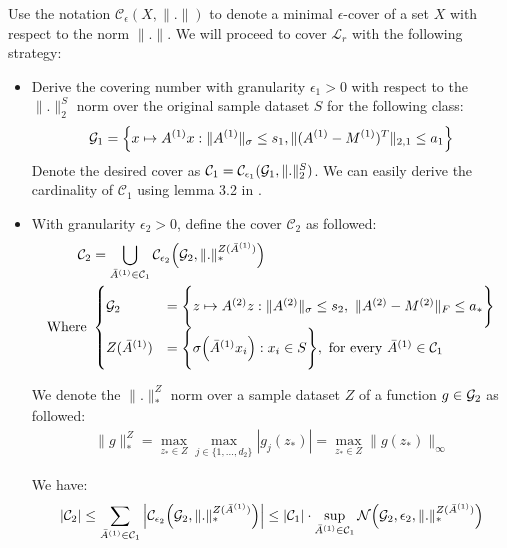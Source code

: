\noindent Use the notation $\mathcal{C}_\epsilon(X, \|.\|)$ to denote a minimal $\epsilon$-cover of a set $X$ with respect to the norm $\|.\|$. We will proceed to cover $\mathcal{L}_r$ with the following strategy:

\begin{itemize}
    \item Derive the covering number with granularity $\epsilon_1 > 0$ with respect to the $\|.\|_2^S$ norm over the original sample dataset $S$ for the following class: 
    \begin{align*}
        \mathcal{G}_1 = \Big\{ 
            x \mapsto A^{(1)}x : \|A^{(1)}\|_\sigma \le s_1, \|(A^{(1)} - M^{(1)})^T\|_{2, 1} \le a_1
         \Big\} 
    \end{align*}
    Denote the desired cover as $\mathcal{C}_1 = \mathcal{C}_{\epsilon_1}({\mathcal{G}_1}, \|.\|_2^S)$. We can easily derive the cardinality of $\mathcal{C}_1$ using lemma 3.2 in \cite{article:bartlett}.

    \item With granularity $\epsilon_2 > 0$, define the cover $\mathcal{C}_2$ as followed:
    \begin{align*}
       \mathcal{C}_2 &= \bigcup_{\bar A^{(1)} \in \mathcal{C}_1} \mathcal{C}_{\epsilon_2} \bigRound{
            \G_2, \|.\|_*^{Z(\bar A^{(1)})}
       } \\
       \text{Where } &\begin{cases}
            \G_2 &= \biggCurl{
                    z \mapsto A^{(2)}z : \|A^{(2)}\|_\sigma \le s_2, \ \|A^{(2)} - M^{(2)}\|_F \le a_*
            } \\
            Z(\bar A^{(1)}) &= \biggCurl{ \sigma\bigRound{\bar A^{(1)}x_i} : x_i \in S }, \ \text{for every } \bar A^{(1)}\in\mathcal{C}_1
       \end{cases}
    \end{align*}

    We denote the $\|.\|_*^Z$ norm over a sample dataset $Z$ of a function $g\in\mathcal{G}_2$ as followed:
    \begin{align*}
        \|g\|_*^Z = \max_{z_* \in Z}\max_{j\in\{1, \dots, d_2\}} |g_j(z_*)| = \max_{z_* \in Z} \|g(z_*)\|_\infty
    \end{align*}

    We have:
    \begin{align*}
        |\mathcal{C}_2| \le \sum_{\bar A^{(1)} \in \mathcal{C}_1} \Big| 
            \mathcal{C}_{\epsilon_2} \Big( 
                \mathcal{G}_2, \|.\|_*^{Z(\bar A^{(1)})}
             \Big) 
         \Big| \le |\mathcal{C}_1| \cdot \sup_{\bar A^{(1)} \in \mathcal{C}_1} \mathcal{N}\Big( 
            \mathcal{G}_2, \epsilon_2, \|.\|_*^{Z(\bar A^{(1)})}
         \Big)
    \end{align*}


\end{itemize}
